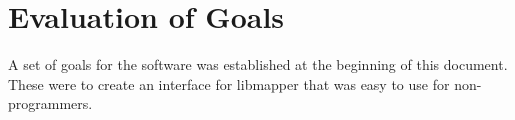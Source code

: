 \section{Evaluation of Goals} %
\label{sec:evaluation_of_goals}

A set of goals for the software was established at the beginning of this document. These were to create an interface for libmapper that was easy to use for non-programmers. 
	






